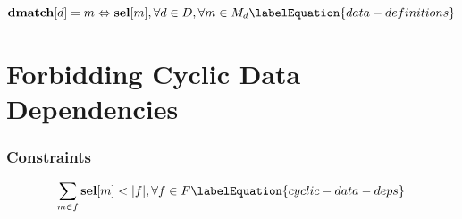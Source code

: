 \begin{equation}
  \mVar{dmatch}[d] = m \mEq \mVar{sel}[m],
  \forall d \in \mDatumSet,
  \forall m \in \mMatchSet[d]
  \labelEquation{data-definitions}
\end{equation}



\section{Forbidding Cyclic Data Dependencies}

\subsubsection{Constraints}

\begin{equation}
  \sum_{m \in f} \mVar{sel}[m] < \mCard{f},
  \forall f \in \mForbiddenCombSet
  \labelEquation{cyclic-data-deps}
\end{equation}
